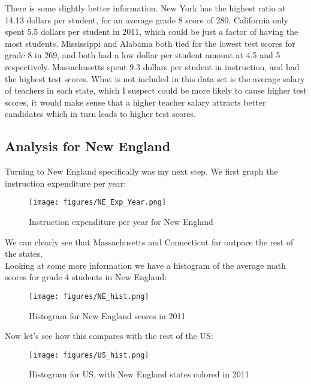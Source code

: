 \documentclass[
]{article}
\begin{document}
There is some slightly better information. New York has the highest ratio at 14.13 dollars per student, for an average grade 8 score of 280. California only spent 5.5 dollars per student in 2011, which could be just a factor of having the most students. Mississippi and Alabama both tied for the lowest test scores for grade 8 in 269, and both had a low dollar per student amount at 4.5 and 5 respectively. Massachusetts spent 9.3 dollars per student in instruction, and had the highest test scores. What is not included in this data set is the average salary of teachers in each state, which I suspect could be more likely to cause higher test scores, it would make sense that a higher teacher salary attracts better candidates which in turn leads to higher test scores.\\

\subsection{Analysis for New England} 
Turning to New England specifically was my next step. We first graph the instruction expenditure per year:
\begin{figure}[!ht]
	\centering
	\texttt{[image: figures/NE\_Exp\_Year.png]}
	\caption{Instruction expenditure per year for New England}
\end{figure} 

We can clearly see that Massachusetts and Connecticut far outpace the rest of the states.\\
Looking at some more information we have a histogram of the average math scores for grade 4 students in New England:

\begin{figure}[!h]
	\centering
	\texttt{[image: figures/NE\_hist.png]}
	\caption{Histogram for New England scores in 2011}
\end{figure} 
\newpage
Now let's see how this compares with the rest of the US:
\begin{figure}[!h]
	\centering
	\texttt{[image: figures/US\_hist.png]}
	\caption{Histogram for US, with New England states colored in 2011}
\end{figure} 
\end{document}
